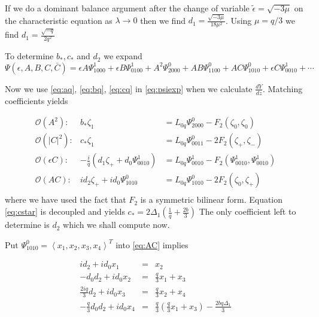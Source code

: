 If we do a dominant balance argument after the change of variable $\tilde{\epsilon} = \sqrt{-3 \mu}$ on the characteristic equation as $\lambda \rightarrow 0 $ then we find $d_1 = \frac{ \sqrt{-3 \mu} }{18 \mu^2 } $. Using $\mu=q/3$ we find $d_1 = \frac{\sqrt{-q}}{2 q^2} $ 

To determine $b_*,c_*$ and $d_2$ we expand 
\begin{equation}\label{eq:psiexp}
\Psi(\epsilon,A,B,C,\bar{C}) = \epsilon A \Psi_{1000}^1 + \epsilon B \Psi_{0100}^1 + A^2 \Psi_{2000}^0 + A B \Psi_{1100}^0 + A C \Psi_{1010}^0 + \epsilon C \Psi_{0010}^1 + \cdots 
\end{equation}

Now we use \eqref{eq:aq}, \eqref{eq:bq}, \eqref{eq:cq} in  \eqref{eq:psiexp} when we calculate $\frac{dY}{dz}$. Matching coefficients yields


\begin{subequations}
\begin{eqnarray}
\mathcal{O}(A^2): &		b_* \zeta_1 &= L_{0q} \Psi_{2000}^0 - F_2(\zeta_0,\zeta_0) \\
\mathcal{O}(\left|C\right|^2):&	c_* \zeta_1 &= L_{0q} \Psi_{0011}^0 -2 F_2(\zeta_+,\zeta_-) \label{eq:cstar} \\
\mathcal{O}(\epsilon C): &-\frac{i}{q} \left(d_1 \zeta_+ +  d_0 \Psi_{0010}^1\right) &= L_{0q} \Psi_{0010}^1 - F_2(\Psi_{0010}^1,\Psi_{0010}^1) \\
\mathcal{O}(A C): 	&i d_2 \zeta_+ + i d_0 \Psi_{1010}^0 &= L_{0q} \Psi_{1010}^0 - 2 F_2(\zeta_0,\zeta_+) \\ \label{eq:AC}
\end{eqnarray}
\end{subequations}
where we have used the fact that $F_2$ is a symmetric bilinear form. Equation \eqref{eq:cstar} is decoupled and yields 
$ c_* = 2 \Delta_1 \left(\frac{1}{q} + \frac{2 b}{3} \right)$ The only coefficient left to determine is $d_2$ which we shall compute now. 

Put $\Psi_{1010}^0 = \left<x_1,x_2,x_3,x_4\right>^T$  into \eqref{eq:AC} implies 

\begin{subequations}
\begin{eqnarray}
i d_2 + i d_0 x_1 &=& x_2 \label{eq:one} \\
- d_0 d_2 + i d_0 x_2 &=& \frac{q}{3} x_1 + x_3 \label{eq:two} \\
\frac{2 i q}{3} d_2 + i d_0 x_3 &=& \frac{q}{3} x_2 + x_4  \label{eq:three} \\
- \frac{q}{3} d_0 d_2 + i d_0 x_4 &=& \frac{q}{3}\left(\frac{q}{3} x_1 + x_3 \right) - \frac{ 2 b q \Delta_1} {3} \label{eq:four}
\end{eqnarray}
\end{subequations}


